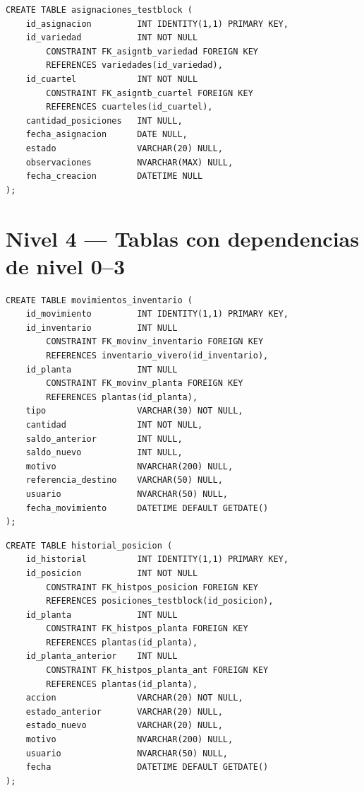 \documentclass[12pt,a4paper,twoside]{report}
\begin{document}
\begin{lstlisting}[style=sqlstyle, caption={asignaciones\_testblock}]
CREATE TABLE asignaciones_testblock (
    id_asignacion         INT IDENTITY(1,1) PRIMARY KEY,
    id_variedad           INT NOT NULL
        CONSTRAINT FK_asigntb_variedad FOREIGN KEY
        REFERENCES variedades(id_variedad),
    id_cuartel            INT NOT NULL
        CONSTRAINT FK_asigntb_cuartel FOREIGN KEY
        REFERENCES cuarteles(id_cuartel),
    cantidad_posiciones   INT NULL,
    fecha_asignacion      DATE NULL,
    estado                VARCHAR(20) NULL,
    observaciones         NVARCHAR(MAX) NULL,
    fecha_creacion        DATETIME NULL
);
\end{lstlisting}

\section{Nivel 4 --- Tablas con dependencias de nivel 0--3}

\begin{lstlisting}[style=sqlstyle, caption={movimientos\_inventario}]
CREATE TABLE movimientos_inventario (
    id_movimiento         INT IDENTITY(1,1) PRIMARY KEY,
    id_inventario         INT NULL
        CONSTRAINT FK_movinv_inventario FOREIGN KEY
        REFERENCES inventario_vivero(id_inventario),
    id_planta             INT NULL
        CONSTRAINT FK_movinv_planta FOREIGN KEY
        REFERENCES plantas(id_planta),
    tipo                  VARCHAR(30) NOT NULL,
    cantidad              INT NOT NULL,
    saldo_anterior        INT NULL,
    saldo_nuevo           INT NULL,
    motivo                NVARCHAR(200) NULL,
    referencia_destino    VARCHAR(50) NULL,
    usuario               NVARCHAR(50) NULL,
    fecha_movimiento      DATETIME DEFAULT GETDATE()
);
\end{lstlisting}

\begin{lstlisting}[style=sqlstyle, caption={historial\_posicion}]
CREATE TABLE historial_posicion (
    id_historial          INT IDENTITY(1,1) PRIMARY KEY,
    id_posicion           INT NOT NULL
        CONSTRAINT FK_histpos_posicion FOREIGN KEY
        REFERENCES posiciones_testblock(id_posicion),
    id_planta             INT NULL
        CONSTRAINT FK_histpos_planta FOREIGN KEY
        REFERENCES plantas(id_planta),
    id_planta_anterior    INT NULL
        CONSTRAINT FK_histpos_planta_ant FOREIGN KEY
        REFERENCES plantas(id_planta),
    accion                VARCHAR(20) NOT NULL,
    estado_anterior       VARCHAR(20) NULL,
    estado_nuevo          VARCHAR(20) NULL,
    motivo                NVARCHAR(200) NULL,
    usuario               NVARCHAR(50) NULL,
    fecha                 DATETIME DEFAULT GETDATE()
);
\end{lstlisting}
\end{document}
